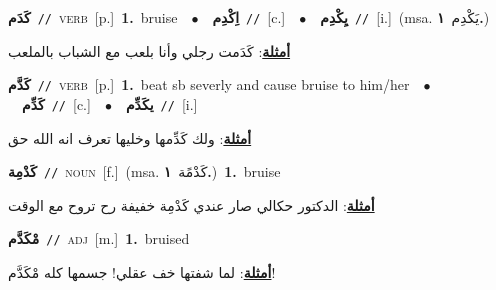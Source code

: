 \documentclass[10pt,a4paper,twoside]{article} %
\begin{document}
\begin{multicols}{2}
{\setlength\topsep{0pt}\textbf{\foreignlanguage{arabic}{كَدَم}}\ {\color{gray}\texttt{//}\color{black}}\ \textsc{verb}\ [p.]\ \textbf{1.}~bruise\ \ $\bullet$\ \ \setlength\topsep{0pt}\textbf{\foreignlanguage{arabic}{اِكْدِم}}\ {\color{gray}\texttt{//}\color{black}}\ [c.]\ \ $\bullet$\ \ \setlength\topsep{0pt}\textbf{\foreignlanguage{arabic}{يِكْدِم}}\ {\color{gray}\texttt{//}\color{black}}\ [i.]\ \color{gray}(msa. \foreignlanguage{arabic}{يَكْدِم}~\foreignlanguage{arabic}{\textbf{١.}})\color{black}\  \begin{flushright}\color{gray}\foreignlanguage{arabic}{\textbf{\underline{\foreignlanguage{arabic}{أمثلة}}}: كَدَمت رجلي وأنا بلعب مع الشباب بالملعب}\end{flushright}\color{black}} \vspace{2mm}

{\setlength\topsep{0pt}\textbf{\foreignlanguage{arabic}{كَدَّم}}\ {\color{gray}\texttt{//}\color{black}}\ \textsc{verb}\ [p.]\ \textbf{1.}~beat sb severly and cause bruise to him/her\ \ $\bullet$\ \ \setlength\topsep{0pt}\textbf{\foreignlanguage{arabic}{كَدِّم}}\ {\color{gray}\texttt{//}\color{black}}\ [c.]\ \ $\bullet$\ \ \setlength\topsep{0pt}\textbf{\foreignlanguage{arabic}{يكَدِّم}}\ {\color{gray}\texttt{//}\color{black}}\ [i.]\  \begin{flushright}\color{gray}\foreignlanguage{arabic}{\textbf{\underline{\foreignlanguage{arabic}{أمثلة}}}: ولك كَدِّمها وخليها تعرف انه الله حق}\end{flushright}\color{black}} \vspace{2mm}

{\setlength\topsep{0pt}\textbf{\foreignlanguage{arabic}{كَدْمِة}}\ {\color{gray}\texttt{//}\color{black}}\ \textsc{noun}\ [f.]\ \color{gray}(msa. \foreignlanguage{arabic}{كَدْمًة}~\foreignlanguage{arabic}{\textbf{١.}})\color{black}\ \textbf{1.}~bruise\  \begin{flushright}\color{gray}\foreignlanguage{arabic}{\textbf{\underline{\foreignlanguage{arabic}{أمثلة}}}: الدكتور حكالي صار عندي كَدْمِة خفيفة رح تروح مع الوقت}\end{flushright}\color{black}} \vspace{2mm}

{\setlength\topsep{0pt}\textbf{\foreignlanguage{arabic}{مْكَدَّم}}\ {\color{gray}\texttt{//}\color{black}}\ \textsc{adj}\ [m.]\ \textbf{1.}~bruised\  \begin{flushright}\color{gray}\foreignlanguage{arabic}{\textbf{\underline{\foreignlanguage{arabic}{أمثلة}}}: لما شفتها خف عقلي! جسمها كله مْكَدَّم!}\end{flushright}\color{black}} \vspace{2mm}


\end{multicols}
\end{document}
